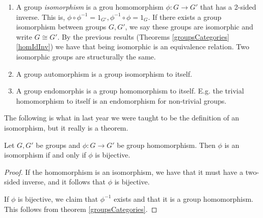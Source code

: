 \begin{definition}
  \begin{enumerate}
    \item A group \emph{isomorphism} is a grou homomorphism $\phi:G\to G'$ that has a
      2-sided inverse. This is, $\phi\circ\phi^{-1}=1_{G'},\phi^{-1}\circ\phi=1_G$. If
      there exists a group isomorphism between groups $G,G'$, we say these groups are
      isomorphic and write $G\cong G'$. By the previous results (Theorems
      \ref{groupsCategories} \ref{homIdInv}) we have that being isomorphic is an
      equivalence relation. Two isomorphic groups are structurally the same.

    \item A group automorphism is a group isomorphism to itself.
    \item A group endomorphis is a group homomorphism to itself. E.g. the trivial
      homomorphism to itself is an endomorphism for non-trivial groups.
  \end{enumerate}
  \label{morphismZoo}
\end{definition}

The following is what in last year we were taught to be the definition of an isomorphism,
but it really is a theorem.
\begin{theorem}
  Let $G,G'$ be groups and $\phi:G\to G'$ be group homomorphism. Then $\phi$ is an
  isomorphism if and only if $\phi$ is bijective.
  \label{isomorphismBijective}
\end{theorem}
\begin{proof}
  If the homomorphism is an isomorphism, we have that it must have a two-sided inverse,
  and it follows that $\phi$ is bijective. 

  If $\phi$ is bijective, we claim that $\phi^{-1}$ exists and that it is a group
  homomorphism. This follows from theorem \ref{groupsCategories}.
\end{proof}
